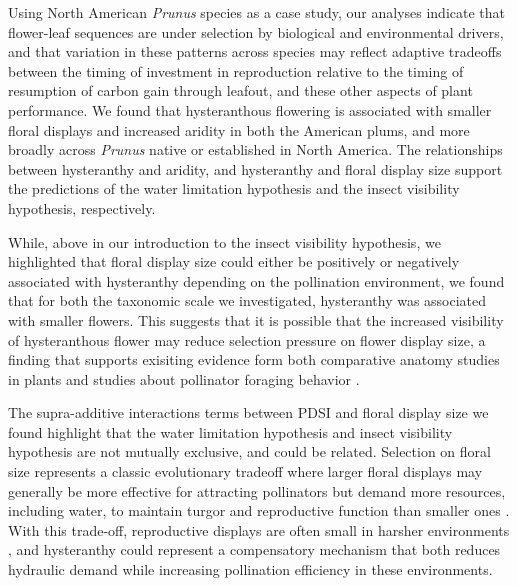 \documentclass{article}[12pt]
\begin{document}
{%
Using North American \textit{Prunus} species as a case study, our analyses indicate that flower-leaf sequences are under selection by biological and environmental drivers, and that variation in these patterns across species may reflect adaptive tradeoffs between the timing of investment in reproduction relative to the timing of resumption of carbon gain through leafout, and these other aspects of plant performance. We found that hysteranthous flowering is associated with smaller floral displays and increased aridity in both the American plums, and more broadly across \emph{Prunus} native or established in North America. The relationships between hysteranthy and aridity, and hysteranthy and floral display size support the predictions of the water limitation hypothesis and the insect visibility hypothesis, respectively. 

While, above in our introduction to the insect visibility hypothesis, we highlighted that floral display size could either be positively or negatively associated with hysteranthy depending on the pollination environment, we found that for both the taxonomic scale we investigated, hysteranthy was associated with smaller flowers. This suggests that it is possible that the increased visibility of hysteranthous flower may reduce selection pressure on flower display size, a finding that supports exisiting evidence form both comparative anatomy studies in plants \citep{Gunatilleke1984} and studies about pollinator foraging behavior \citep{Forrest:2009aa,Rivest:2017aa}.


The supra-additive interactions terms between PDSI and floral display size we found highlight that the water limitation hypothesis and insect visibility hypothesis are not mutually exclusive, and could be related. Selection on floral size represents a classic evolutionary tradeoff where larger floral displays may generally be more effective for attracting pollinators but demand more resources, including water, to maintain turgor and reproductive function than smaller ones \citep{Galen:1999vr,Lambrecht:2007ur}. With this trade-off, reproductive displays are often small in harsher environments \citep{Teixido:2016aa,Lambrecht:2013aa}, and hysteranthy could represent a compensatory mechanism that both reduces hydraulic demand while increasing pollination efficiency in these environments.

}
\end{document}
